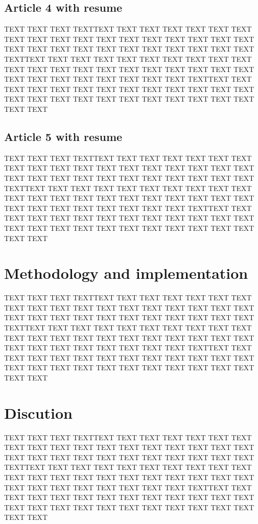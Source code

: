 \documentclass[10pt,conference,letterpaper]{IEEEtran}
\begin{document}
\subsection{Article 4 with resume}
%
\par 
TEXT TEXT TEXT TEXTTEXT TEXT TEXT TEXT  TEXT TEXT  TEXT TEXT  TEXT TEXT  TEXT TEXT  TEXT TEXT  TEXT TEXT  TEXT TEXT  TEXT TEXT  TEXT TEXT  TEXT TEXT  TEXT TEXT 
TEXT TEXT TEXT TEXTTEXT TEXT TEXT TEXT  TEXT TEXT  TEXT TEXT  TEXT TEXT  TEXT TEXT  TEXT TEXT  TEXT TEXT  TEXT TEXT  TEXT TEXT  TEXT TEXT  TEXT TEXT  TEXT TEXT 
TEXT TEXT TEXT TEXTTEXT TEXT TEXT TEXT  TEXT TEXT  TEXT TEXT  TEXT TEXT  TEXT TEXT  TEXT TEXT  TEXT TEXT  TEXT TEXT  TEXT TEXT  TEXT TEXT  TEXT TEXT  TEXT TEXT 

\subsection{Article 5 with resume}
%
\par 
TEXT TEXT TEXT TEXTTEXT TEXT TEXT TEXT  TEXT TEXT  TEXT TEXT  TEXT TEXT  TEXT TEXT  TEXT TEXT  TEXT TEXT  TEXT TEXT  TEXT TEXT  TEXT TEXT  TEXT TEXT  TEXT TEXT 
TEXT TEXT TEXT TEXTTEXT TEXT TEXT TEXT  TEXT TEXT  TEXT TEXT  TEXT TEXT  TEXT TEXT  TEXT TEXT  TEXT TEXT  TEXT TEXT  TEXT TEXT  TEXT TEXT  TEXT TEXT  TEXT TEXT 
TEXT TEXT TEXT TEXTTEXT TEXT TEXT TEXT  TEXT TEXT  TEXT TEXT  TEXT TEXT  TEXT TEXT  TEXT TEXT  TEXT TEXT  TEXT TEXT  TEXT TEXT  TEXT TEXT  TEXT TEXT  TEXT TEXT 


\section{Methodology and implementation}
%
\par 
TEXT TEXT TEXT TEXTTEXT TEXT TEXT TEXT  TEXT TEXT  TEXT TEXT  TEXT TEXT  TEXT TEXT  TEXT TEXT  TEXT TEXT  TEXT TEXT  TEXT TEXT  TEXT TEXT  TEXT TEXT  TEXT TEXT 
TEXT TEXT TEXT TEXTTEXT TEXT TEXT TEXT  TEXT TEXT  TEXT TEXT  TEXT TEXT  TEXT TEXT  TEXT TEXT  TEXT TEXT  TEXT TEXT  TEXT TEXT  TEXT TEXT  TEXT TEXT  TEXT TEXT 
TEXT TEXT TEXT TEXTTEXT TEXT TEXT TEXT  TEXT TEXT  TEXT TEXT  TEXT TEXT  TEXT TEXT  TEXT TEXT  TEXT TEXT  TEXT TEXT  TEXT TEXT  TEXT TEXT  TEXT TEXT  TEXT TEXT 


\section{Discution}

\par 
TEXT TEXT TEXT TEXTTEXT TEXT TEXT TEXT  TEXT TEXT  TEXT TEXT  TEXT TEXT  TEXT TEXT  TEXT TEXT  TEXT TEXT  TEXT TEXT  TEXT TEXT  TEXT TEXT  TEXT TEXT  TEXT TEXT 
TEXT TEXT TEXT TEXTTEXT TEXT TEXT TEXT  TEXT TEXT  TEXT TEXT  TEXT TEXT  TEXT TEXT  TEXT TEXT  TEXT TEXT  TEXT TEXT  TEXT TEXT  TEXT TEXT  TEXT TEXT  TEXT TEXT 
TEXT TEXT TEXT TEXTTEXT TEXT TEXT TEXT  TEXT TEXT  TEXT TEXT  TEXT TEXT  TEXT TEXT  TEXT TEXT  TEXT TEXT  TEXT TEXT  TEXT TEXT  TEXT TEXT  TEXT TEXT  TEXT TEXT 
\end{document}
